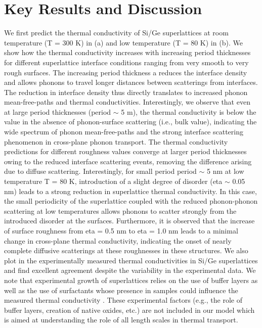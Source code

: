 \section{Key Results and Discussion}
We first predict the thermal conductivity of Si/Ge superlattices at room temperature (\gls{T} = 300 K) in (a) and low temperature (\gls{T} = 80 K) in (b). We show how the thermal conductivity increases with increasing period thicknesses for different superlattice interface conditions ranging from very smooth to very rough surfaces. The increasing period thickness a reduces the interface density and allows phonons to travel longer distances between scatterings from interfaces. The reduction in interface density thus directly translates to increased phonon mean-free-paths and thermal conductivities. Interestingly, we observe that even at large period thicknesses (\gls{period} $\sim$ 5 \si{\micro}m), the thermal conductivity is below the value in the absence of phonon-surface scattering (i.e., bulk value), indicating the wide spectrum of phonon mean-free-paths and the strong interface scattering phenomenon in cross-plane phonon transport. The thermal conductivity predictions for different roughness values converge at larger period thicknesses owing to the reduced interface scattering events, removing the difference arising due to diffuse scattering. Interestingly, for small period \gls{period} $\sim$ 5 nm at low temperature \gls{T} = 80 K, introduction of a slight degree of disorder (\gls{eta} $\sim$ 0.05 nm) leads to a strong reduction in superlattice thermal conductivity. In this case, the small periodicity of the superlattice coupled with the reduced phonon-phonon scattering at low temperatures allows phonons to scatter strongly from the introduced disorder at the surfaces. Furthermore, it is observed that the increase of surface roughness from \gls{eta} = 0.5 nm to \gls{eta} = 1.0 nm leads to a minimal change in cross-plane thermal conductivity, indicating the onset of nearly complete diffusive scatterings at these roughnesses in these structures. We also plot in  the experimentally measured thermal conductivities in Si/Ge superlattices and find excellent agreement despite the variability in the experimental data. We note that experimental growth of superlattices relies on the use of buffer layers as well as the use of surfactants whose presence in samples could influence the measured thermal conductivity \cite{RN361,RN297,RN298,RN300}. These experimental factors (e.g., the role of buffer layers, creation of native oxides, etc.) are not included in our model which is aimed at understanding the role of all length scales in thermal transport.
